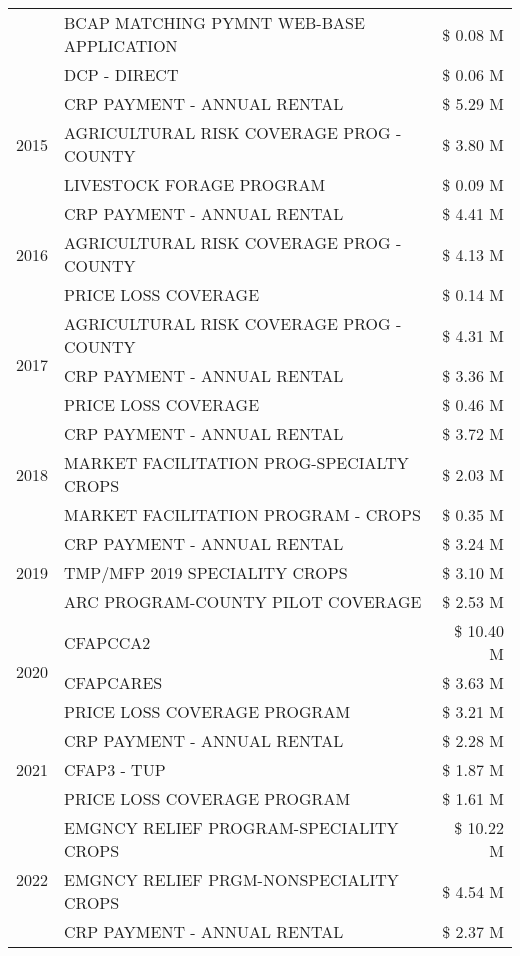 \begin{tabular}{llr}
 & BCAP MATCHING PYMNT WEB-BASE APPLICATION & \$ 0.08 M \\
 & DCP - DIRECT & \$ 0.06 M \\
\cline{1-3}
\multirow[t]{3}{*}{2015} & CRP PAYMENT - ANNUAL RENTAL & \$ 5.29 M \\
 & AGRICULTURAL RISK COVERAGE PROG - COUNTY & \$ 3.80 M \\
 & LIVESTOCK FORAGE PROGRAM & \$ 0.09 M \\
\cline{1-3}
\multirow[t]{3}{*}{2016} & CRP PAYMENT - ANNUAL RENTAL & \$ 4.41 M \\
 & AGRICULTURAL RISK COVERAGE PROG - COUNTY & \$ 4.13 M \\
 & PRICE LOSS COVERAGE & \$ 0.14 M \\
\cline{1-3}
\multirow[t]{3}{*}{2017} & AGRICULTURAL RISK COVERAGE PROG - COUNTY & \$ 4.31 M \\
 & CRP PAYMENT - ANNUAL RENTAL & \$ 3.36 M \\
 & PRICE LOSS COVERAGE & \$ 0.46 M \\
\cline{1-3}
\multirow[t]{3}{*}{2018} & CRP PAYMENT - ANNUAL RENTAL & \$ 3.72 M \\
 & MARKET FACILITATION PROG-SPECIALTY CROPS & \$ 2.03 M \\
 & MARKET FACILITATION PROGRAM - CROPS & \$ 0.35 M \\
\cline{1-3}
\multirow[t]{3}{*}{2019} & CRP PAYMENT - ANNUAL RENTAL & \$ 3.24 M \\
 & TMP/MFP 2019 SPECIALITY CROPS & \$ 3.10 M \\
 & ARC PROGRAM-COUNTY PILOT COVERAGE & \$ 2.53 M \\
\cline{1-3}
\multirow[t]{3}{*}{2020} & CFAPCCA2 & \$ 10.40 M \\
 & CFAPCARES & \$ 3.63 M \\
 & PRICE LOSS COVERAGE PROGRAM & \$ 3.21 M \\
\cline{1-3}
\multirow[t]{3}{*}{2021} & CRP PAYMENT - ANNUAL RENTAL & \$ 2.28 M \\
 & CFAP3 - TUP & \$ 1.87 M \\
 & PRICE LOSS COVERAGE PROGRAM & \$ 1.61 M \\
\cline{1-3}
\multirow[t]{3}{*}{2022} & EMGNCY RELIEF PROGRAM-SPECIALITY CROPS & \$ 10.22 M \\
 & EMGNCY RELIEF PRGM-NONSPECIALITY CROPS & \$ 4.54 M \\
 & CRP PAYMENT - ANNUAL RENTAL & \$ 2.37 M \\
\cline{1-3}
\bottomrule
\end{tabular}
